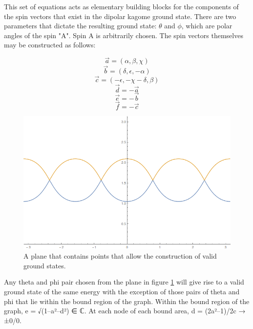 This set of equations acts as elementary building blocks for the components of the spin vectors that exist in the dipolar kagome ground state. There are two parameters that dictate the resulting ground state: $\theta$ and $\phi$, which are polar angles of the spin "A". Spin A is arbitrarily chosen. The spin vectors themselves may be constructed as follows:

$$\overrightarrow{a} = (\alpha, \beta, \chi)$$
$$\overrightarrow{b} = (\delta, \epsilon, -\alpha)$$
$$\overrightarrow{c} = (-\epsilon, -\chi-\delta, \beta)$$
$$\overrightarrow{d} =-\overrightarrow{a}$$
$$\overrightarrow{e} =-\overrightarrow{b}$$
$$\overrightarrow{f} =-\overrightarrow{c}$$

\clearpage

\begin{figure}
	\includegraphics[width=\linewidth]{img/degeneracyplanefull.png}
	\caption{A plane that contains points that allow the construction of valid ground states.}
	\label{fig:degenplanefull}
\end{figure}


Any theta and phi pair chosen from the plane in figure \ref{fig:degenplanefull} will give rise to a valid ground state of the same energy with the exception of those pairs of theta and phi that lie within the bound region of the graph. Within the bound region of the graph, e = √(1–a²–d²) ∈ ℂ. At each node of each bound area, d = (2a²–1)/2c → ±0/0.

